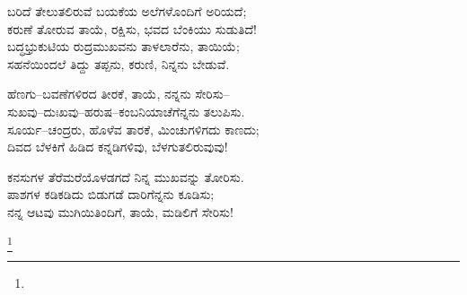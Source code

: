 \begin{myquote}
ಬರಿದೆ ತೇಲುತಲಿರುವೆ ಬಯಕೆಯ ಅಲೆಗಳೊಂದಿಗೆ ಅರಿಯದೆ;\\ಕರುಣೆ ತೋರುವ ತಾಯೆ, ರಕ್ಷಿಸು, ಭವದ ಬೆಂಕಿಯು ಸುಡುತಿದೆ!\\ಬದ್ಧಭ್ರುಕುಟಿಯ ರುದ್ರಮುಖವನು ತಾಳಲಾರೆನು, ತಾಯಿಯೆ;\\ಸಹನೆಯಿಂದಲೆ ತಿದ್ದು ತಪ್ಪನು, ಕರುಣಿ, ನಿನ್ನನು ಬೇಡುವೆ.
\end{myquote}

\begin{myquote}
ಹೆಣಗು–ಬವಣೆಗಳಿರದ ತೀರಕೆ, ತಾಯೆ, ನನ್ನನು ಸೇರಿಸು–\\ಸುಖವು–ದುಃಖವು–ಹರುಷ–ಕಂಬನಿಯಾಚೆಗೆನ್ನನು ತಲುಪಿಸು.\\ಸೂರ್ಯ–ಚಂದ್ರರು, ಹೊಳೆವ ತಾರಕೆ, ಮಿಂಚುಗಳಿಗದು ಕಾಣದು;\\ದಿವದ ಬೆಳಕಿಗೆ ಹಿಡಿದ ಕನ್ನಡಿಗಳಿವು, ಬೆಳಗುತಲಿರುವುವು!
\end{myquote}

\begin{myquote}
ಕನಸುಗಳ ತೆರೆಮರೆಯೊಳಡಗದೆ ನಿನ್ನ ಮುಖವನ್ನು ತೋರಿಸು.\\ಪಾಶಗಳ ಕಡಿಕಡಿದು ಬಿಡುಗಡೆ ದಾರಿಗೆನ್ನನು ಕೂಡಿಸು;\\ನನ್ನ ಆಟವು ಮುಗಿಯಿತಿಂದಿಗೆ, ತಾಯೆ, ಮಡಿಲಿಗೆ ಸೇರಿಸು!
\end{myquote}

\protect\footnote{}

\begin{myquote}
\end{myquote}

\begin{myquote}
\end{myquote}

\begin{myquote}
\end{myquote}

